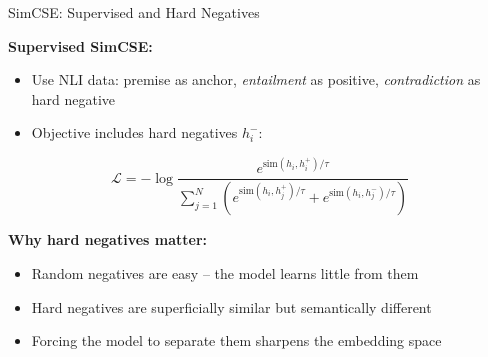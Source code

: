 \documentclass[11pt,compress,t,notes=noshow, xcolor=table]{beamer}
\begin{document}

\begin{frame}{SimCSE: Supervised and Hard Negatives}

\vfill

\textbf{Supervised SimCSE:}
\begin{itemize}
  \item Use NLI data: premise as anchor, \textit{entailment} as positive, \textit{contradiction} as hard negative
  \item Objective includes hard negatives $h_i^-$:
\end{itemize}

$$\mathcal{L} = -\log \frac{e^{\text{sim}(h_i, h_i^+)/\tau}}{\sum_{j=1}^{N} \left(e^{\text{sim}(h_i, h_j^+)/\tau} + e^{\text{sim}(h_i, h_j^-)/\tau}\right)}$$

\vfill

\textbf{Why hard negatives matter:}
\begin{itemize}
  \item Random negatives are easy -- the model learns little from them
  \item Hard negatives are superficially similar but semantically different
  \item Forcing the model to separate them sharpens the embedding space
\end{itemize}

\vfill

\end{frame}

\end{document}
